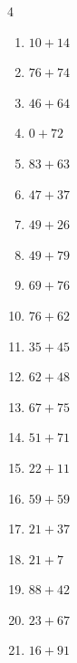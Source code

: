 \begin{multicols}{4}
\begin{enumerate}
  \item $10+14$
        \phantom{$=24$}

  \item $76+74$
        \phantom{$=150$}

  \item $46+64$
        \phantom{$=110$}

  \item $0+72$
        \phantom{$=72$}

  \item $83+63$
        \phantom{$=146$}

  \item $47+37$
        \phantom{$=84$}

  \item $49+26$
        \phantom{$=75$}

  \item $49+79$
        \phantom{$=128$}

  \item $69+76$
        \phantom{$=145$}

  \item $76+62$
        \phantom{$=138$}

  \item $35+45$
        \phantom{$=80$}

  \item $62+48$
        \phantom{$=110$}

  \item $67+75$
        \phantom{$=142$}

\columnbreak %

  \item $51+71$
        \phantom{$=122$}

  \item $22+11$
        \phantom{$=33$}

  \item $59+59$
        \phantom{$=118$}

  \item $21+37$
        \phantom{$=58$}

  \item $21+7$
        \phantom{$=28$}

  \item $88+42$
        \phantom{$=130$}

  \item $23+67$
        \phantom{$=90$}

  \item $16+91$
        \phantom{$=107$}


\end{enumerate}
\end{multicols}
